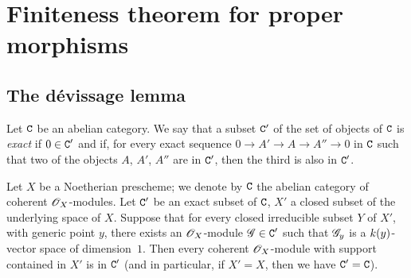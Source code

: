 \section{Finiteness theorem for proper morphisms}
\label{section:3.3}

\subsection{The d\'evissage lemma}
\label{subsection:3.3.1}

\begin{defn}[3.1.1]
\label{3.3.1.1}
Let $\mathtt{C}$ be an abelian category.
We say that a subset $\mathtt{C}'$ of the set of objects of $\mathtt{C}$ is \emph{exact} if $0\in\mathtt{C}'$ and if, for every exact sequence $0\to A'\to A\to A''\to 0$ in $\mathtt{C}$ such that two of the objects $A$, $A'$, $A''$ are in $\mathtt{C}'$, then the third is also in $\mathtt{C}'$.
\end{defn}

\begin{thm}[3.1.2]
\label{3.3.1.2}
Let $X$ be a Noetherian prescheme; we denote by $\mathtt{C}$ the abelian category of coherent $\mathscr{O}_X$-modules.
Let $\mathtt{C}'$ be an exact subset of $\mathtt{C}$, $X'$ a closed subset of the underlying space of $X$.
Suppose that for every closed irreducible subset $Y$ of $X'$, with generic point $y$, there exists an $\mathscr{O}_X$-module $\mathscr{G}\in\mathtt{C}'$ such that $\mathscr{G}_y$ is a $k(y)$-vector space of dimension~$1$.
Then every coherent $\mathscr{O}_X$-module with support contained in $X'$ is in $\mathtt{C}'$ (and in particular, if $X'=X$, then we have $\mathtt{C}'=\mathtt{C}$).
\end{thm}


